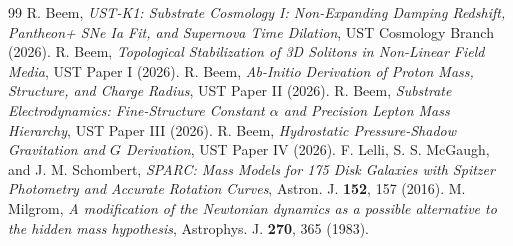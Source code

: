 \documentclass[11pt,a4paper]{article}
\begin{document}
	\begin{thebibliography}{99}
		 R. Beem, \textit{UST-K1: Substrate Cosmology I: Non-Expanding Damping Redshift, Pantheon+ SNe Ia Fit, and Supernova Time Dilation}, UST Cosmology Branch (2026).
		 R. Beem, \textit{Topological Stabilization of 3D Solitons in Non-Linear Field Media}, UST Paper I (2026).
		 R. Beem, \textit{Ab-Initio Derivation of Proton Mass, Structure, and Charge Radius}, UST Paper II (2026).
		 R. Beem, \textit{Substrate Electrodynamics: Fine-Structure Constant $\alpha$ and Precision Lepton Mass Hierarchy}, UST Paper III (2026).
		 R. Beem, \textit{Hydrostatic Pressure-Shadow Gravitation and $G$ Derivation}, UST Paper IV (2026).
		 F. Lelli, S. S. McGaugh, and J. M. Schombert, \textit{SPARC: Mass Models for 175 Disk Galaxies with Spitzer Photometry and Accurate Rotation Curves}, Astron. J. \textbf{152}, 157 (2016).
		 M. Milgrom, \textit{A modification of the Newtonian dynamics as a possible alternative to the hidden mass hypothesis}, Astrophys. J. \textbf{270}, 365 (1983).
	\end{thebibliography}
	
\end{document}
